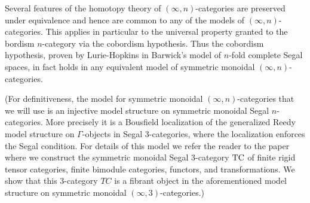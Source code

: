 \documentclass{amsart}
\begin{document}
Several features of the homotopy theory of $(\infty,n)$-categories are preserved under equivalence and hence are common to any of the models of $(\infty,n)$-categories. This applies in particular to the universal property granted to the bordism $n$-category via the cobordism hypothesis. Thus the cobordism hypothesis, proven by Lurie-Hopkins \cite{Lurie_cobhyp} in Barwick's model of $n$-fold complete Segal spaces, in fact holds in any equivalent model of symmetric monoidal $(\infty,n)$-categories. 

(For definitiveness, the model for symmetric monoidal $(\infty,n)$-categories that we will use is an injective model structure on symmetric monoidal Segal $n$-categories. 
More precisely it is a Bousfield localization of the generalized Reedy model structure on $\Gamma$-objects in Segal 3-categories, where the localization enforces the Segal condition. For details of this model we refer the reader to the paper \cite{3TC} where we construct the  symmetric monoidal Segal 3-category $\mathrm{TC}$ of finite rigid tensor categories, finite bimodule categories, functors, and transformations. We show that this 3-category $TC$ is a fibrant object in the aforementioned model structure on symmetric monoidal $(\infty,3)$-categories.) 




\end{document}
